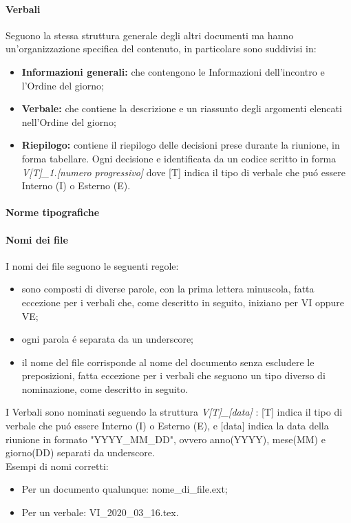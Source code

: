       \paragraph{Verbali\\}
      Seguono la stessa struttura generale degli altri documenti ma hanno un'organizzazione specifica del contenuto, in particolare sono suddivisi in:
      \begin{itemize}
        \item \textbf{Informazioni generali:} che contengono le Informazioni dell'incontro e l'Ordine del giorno;
        \item \textbf{Verbale:} che contiene la descrizione e un riassunto degli argomenti elencati nell'Ordine del giorno;
        \item \textbf{Riepilogo:} contiene il riepilogo delle decisioni prese durante la riunione, in forma tabellare. Ogni decisione e identificata da un codice scritto in forma \textit{V[T]\_1.[numero progressivo]} dove [T] indica il tipo di verbale che puó essere Interno (I) o Esterno (E).
      \end{itemize}

\newpage

      \paragraph{Norme tipografiche}
      \paragraph{Nomi dei file}
      I nomi dei file seguono le seguenti regole:
      \begin{itemize}
        \item sono composti di diverse parole, con la prima lettera minuscola, fatta eccezione per i verbali che, come descritto in seguito, iniziano per VI oppure VE;
        \item ogni parola é separata da un underscore;
        \item il nome del file corrisponde al nome del documento senza escludere le preposizioni, fatta eccezione per i verbali che seguono un tipo diverso di nominazione, come descritto in seguito.
      \end{itemize}
      I Verbali sono nominati seguendo la struttura \textit{V[T]\_[data]} : [T] indica il tipo di verbale che puó essere Interno (I) o Esterno (E), e [data] indica la data della riunione in formato "YYYY\_MM\_DD", ovvero anno(YYYY), mese(MM) e giorno(DD) separati da underscore.\\
      Esempi di nomi corretti:
      \begin{itemize}
        \item Per un documento qualunque: nome\_di\_file.ext;
        \item Per un verbale: VI\_2020\_03\_16.tex.
      \end{itemize}

